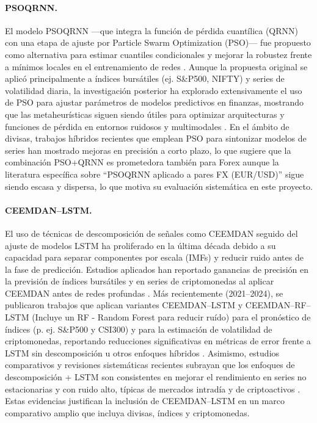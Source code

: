 \documentclass[12pt]{paper}
\begin{document}
\paragraph{PSOQRNN.}
El modelo PSOQRNN —que integra la función de pérdida cuantílica (QRNN) con una etapa de ajuste por Particle Swarm Optimization (PSO)— fue propuesto como alternativa para estimar cuantiles condicionales y mejorar la robustez frente a mínimos locales en el entrenamiento de redes \citep{pradeepkumar2017forecasting}. Aunque la propuesta original se aplicó principalmente a índices bursátiles (ej. S\&P500, NIFTY) y series de volatilidad diaria, la investigación posterior ha explorado extensivamente el uso de PSO para ajustar parámetros de modelos predictivos en finanzas, mostrando que las metaheurísticas siguen siendo útiles para optimizar arquitecturas y funciones de pérdida en entornos ruidosos y multimodales \citep{pradeepkumar2017forecasting, tissaoui2024pso}. En el ámbito de divisas, trabajos híbridos recientes que emplean PSO para sintonizar modelos de series han mostrado mejoras en precisión a corto plazo, lo que sugiere que la combinación PSO+QRNN es prometedora también para Forex aunque la literatura específica sobre ``PSOQRNN aplicado a pares FX (EUR/USD)'' sigue siendo escasa y dispersa, lo que motiva su evaluación sistemática en este proyecto.

\paragraph{CEEMDAN--LSTM.}
El uso de técnicas de descomposición de señales como CEEMDAN seguido del ajuste de modelos LSTM ha proliferado en la última década debido a su capacidad para separar componentes por escala (IMFs) y reducir ruido antes de la fase de predicción. Estudios aplicados han reportado ganancias de precisión en la previsión de índices bursátiles y en series de criptomonedas al aplicar CEEMDAN antes de redes profundas \citep{lin2021ceemdanlstm, cao2019financial}. Más recientemente (2021–2024), se publicaron trabajos que aplican variantes CEEMDAN–LSTM y CEEMDAN–RF–LSTM (Incluye un RF - Random Forest para reducir ruído) para el pronóstico de índices (p. ej. S\&P500 y CSI300) y para la estimación de volatilidad de criptomonedas, reportando reducciones significativas en métricas de error frente a LSTM sin descomposición u otros enfoques híbridos \citep{lin2021ceemdanlstm, wang2024ceemdanrf_lstm}. Asimismo, estudios comparativos y revisiones sistemáticas recientes subrayan que los enfoques de descomposición + LSTM son consistentes en mejorar el rendimiento en series no estacionarias y con ruido alto, típicas de mercados intradía y de criptoactivos \citep{aksehir2024review, zhu2024ceemdan_lstm_bn}. Estas evidencias justifican la inclusión de CEEMDAN--LSTM en un marco comparativo amplio que incluya divisas, índices y criptomonedas.
\end{document}
